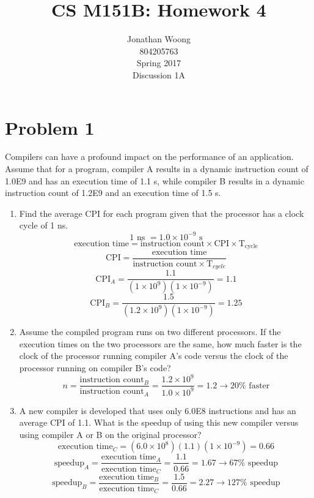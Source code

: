 \documentclass[10pt,letterpaper]{article}
\date{\displaydate{date}}
\begin{document}
\title{CS M151B: Homework 4}
\author{
	Jonathan Woong\\
	804205763\\
	Spring 2017\\
	Discussion 1A}
\maketitle
\pagebreak


\section{Problem 1}
Compilers can have a profound impact on the performance of an application. Assume that for a program, compiler A results in a dynamic instruction count of 1.0E9 and has an execution time of 1.1 s, while compiler B results in a dynamic instruction count of 1.2E9 and an execution time of 1.5 s.
\begin{enumerate}[label=\alph*.]
\item Find the average CPI for each program given that the processor has a clock cycle of 1 ns.
\[1 \text{ ns } = 1.0 \times 10^{-9} \text{ s}\]
\[\text{execution time} = \text{instruction count} \times \text{CPI} \times \text{T}_{\text{cycle}}\]
\[\text{CPI} = \frac{\text{execution time}}{\text{instruction count}\times \text{T}_{cycle}}\]
\[\text{CPI}_A = \frac{1.1}{(1\times10^9)(1\times10^{-9})}=\boxed{1.1}\]
\[\text{CPI}_B = \frac{1.5}{(1.2\times10^9)(1\times10^{-9})}=\boxed{1.25}\]
\item Assume the compiled program runs on two different processors. If the execution times on the two processors are the same, how much faster is the clock of the processor running compiler A's code versus the clock of the processor running on compiler B's code?
\[n = \frac{\text{instruction count}_B}{\text{instruction count}_A} = \frac{1.2\times10^9}{1.0\times10^9}=1.2 \rightarrow \boxed{20\% \text{ faster}}\]
\item A new compiler is developed that uses only 6.0E8 instructions and has an average CPI of 1.1. What is the speedup of using this new compiler versus using compiler A or B on the original processor?
\[\text{execution time}_C = (6.0\times10^8)(1.1)(1\times10^{-9}) = 0.66\]
\[\text{speedup}_A = \frac{\text{execution time}_A}{\text{execution time}_C} = \frac{1.1}{0.66} = 1.67 \rightarrow \boxed{67\% \text{ speedup}}\]
\[\text{speedup}_B = \frac{\text{execution time}_B}{\text{execution time}_C} = \frac{1.5}{0.66} = 2.27 \rightarrow \boxed{127\% \text{ speedup}}\]
\end{enumerate}
\pagebreak
\end{document}
